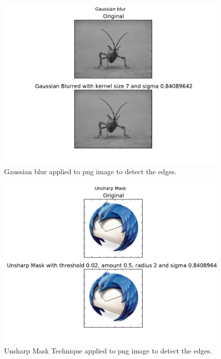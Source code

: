 \documentclass[a4paper]{article}
\begin{document}
\begin{figure}[h!] 
\begin{center} 
\includegraphics[scale=0.5]{../Week4/BLAC_hw6_TLRH_6126561_gaussian_blur.pdf} 
\caption{Gaussian blur applied to png image to detect the edges.}
\end{center} 
\end{figure} 

\newpage


\begin{figure}[h!] 
\begin{center} 
\includegraphics[scale=0.5]{../Week4/BLAC_hw6_TLRH_6126561_unsharp_mask.pdf} 
\caption{Unsharp Mask Technique applied to png image to detect the edges.}
\end{center} 
\end{figure}
\end{document}
